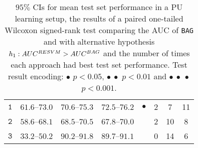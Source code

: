 \begin{table}[!h]
\begin{tabular}{cccccccc}
$\texttt{1}$ & $61.6$--$73.0$ & $70.6$--$75.3$ & $72.5$--$76.2$ & $\bullet$ & 2 & 7 & 11\\ 
$\texttt{2}$ & $58.6$--$68.1$ & $68.5$--$70.5$ & $67.8$--$70.0$ &  & 2 & 10 & 8\\ 
$\texttt{3}$ & $33.2$--$50.2$ & $90.2$--$91.8$ & $89.7$--$91.1$ &  & 0 & 14 & 6\\ 
\bottomrule
\end{tabular}
\caption{$95\%$ CIs for mean test set performance in a PU learning setup, the results of a paired one-tailed Wilcoxon signed-rank test comparing the AUC of \texttt{BAG} and \texttt{\resvm} with alternative hypothesis $h_1: AUC^{RESVM} > AUC^{BAG}$ and the number of times each approach had best test set performance.
Test result encoding: $\bullet$ $p < 0.05$, $\bullet\ \bullet$ $p < 0.01$ and $\bullet\ \bullet\ \bullet$ $p < 0.001$.
}
\label{table:pulearning}
\end{table}

